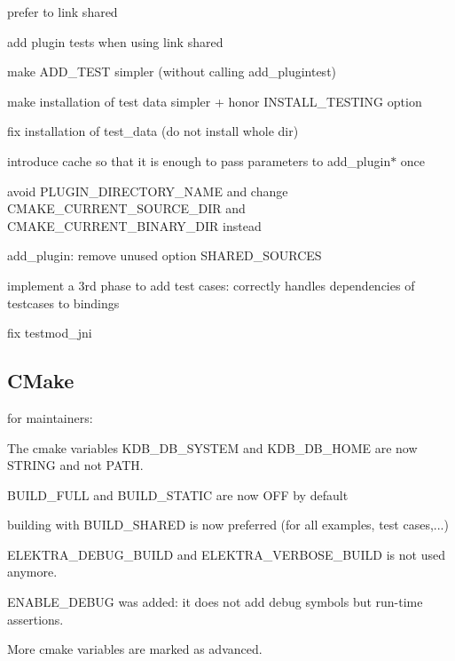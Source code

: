 \begin{DoxyItemize}
\item prefer to link shared
\item add plugin tests when using link shared
\item make A\+D\+D\+\_\+\+T\+E\+S\+T simpler (without calling add\+\_\+plugintest)
\item make installation of test data simpler + honor I\+N\+S\+T\+A\+L\+L\+\_\+\+T\+E\+S\+T\+I\+N\+G option
\item fix installation of test\+\_\+data (do not install whole dir)
\item introduce cache so that it is enough to pass parameters to add\+\_\+plugin$\ast$ once
\item avoid P\+L\+U\+G\+I\+N\+\_\+\+D\+I\+R\+E\+C\+T\+O\+R\+Y\+\_\+\+N\+A\+M\+E and change C\+M\+A\+K\+E\+\_\+\+C\+U\+R\+R\+E\+N\+T\+\_\+\+S\+O\+U\+R\+C\+E\+\_\+\+D\+I\+R and C\+M\+A\+K\+E\+\_\+\+C\+U\+R\+R\+E\+N\+T\+\_\+\+B\+I\+N\+A\+R\+Y\+\_\+\+D\+I\+R instead
\item add\+\_\+plugin\+: remove unused option S\+H\+A\+R\+E\+D\+\_\+\+S\+O\+U\+R\+C\+E\+S
\item implement a 3rd phase to add test cases\+: correctly handles dependencies of testcases to bindings
\item fix testmod\+\_\+jni
\end{DoxyItemize}

\subsection*{C\+Make}

for maintainers\+:


\begin{DoxyItemize}
\item The cmake variables K\+D\+B\+\_\+\+D\+B\+\_\+\+S\+Y\+S\+T\+E\+M and K\+D\+B\+\_\+\+D\+B\+\_\+\+H\+O\+M\+E are now S\+T\+R\+I\+N\+G and not P\+A\+T\+H.
\item B\+U\+I\+L\+D\+\_\+\+F\+U\+L\+L and B\+U\+I\+L\+D\+\_\+\+S\+T\+A\+T\+I\+C are now O\+F\+F by default
\item building with B\+U\+I\+L\+D\+\_\+\+S\+H\+A\+R\+E\+D is now preferred (for all examples, test cases,...)
\item E\+L\+E\+K\+T\+R\+A\+\_\+\+D\+E\+B\+U\+G\+\_\+\+B\+U\+I\+L\+D and E\+L\+E\+K\+T\+R\+A\+\_\+\+V\+E\+R\+B\+O\+S\+E\+\_\+\+B\+U\+I\+L\+D is not used anymore.
\item E\+N\+A\+B\+L\+E\+\_\+\+D\+E\+B\+U\+G was added\+: it does not add debug symbols but run-\/time assertions.
\item More cmake variables are marked as advanced.
\end{DoxyItemize}

